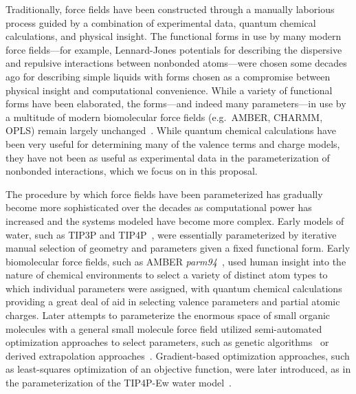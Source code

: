 \documentclass[aps,pre,twocolumn,nofootinbib,superscriptaddress,linenumbers]{revtex4-1}
\begin{document}
Traditionally, force fields have been constructed through a manually laborious process guided by a combination of experimental data, quantum chemical calculations, and physical insight.
The functional forms in use by many modern force fields---for example, Lennard-Jones potentials for describing the dispersive and repulsive interactions between nonbonded atoms---were chosen some decades ago for describing simple liquids with forms chosen as a compromise between physical insight and computational convenience.
While a variety of functional forms have been elaborated, the forms---and indeed many parameters---in use by a multitude of modern biomolecular force fields (e.g.~AMBER, CHARMM, OPLS) remain largely unchanged~\citep{ponder-case:adv-prot-chem:2003:force-fields-review}.
While quantum chemical calculations have been very useful for determining many of the valence terms and charge models, they have not been as useful as experimental data in the parameterization of nonbonded interactions, which we focus on in this proposal.

The procedure by which force fields have been parameterized has gradually become more sophisticated over the decades as computational power has increased and the systems modeled have become more complex.
Early models of water, such as TIP3P and TIP4P~\cite{jorgensen_comparison_1983}, were essentially parameterized by iterative manual selection of geometry and parameters given a fixed functional form.
Early biomolecular force fields, such as AMBER {\em parm94}~\cite{cornell-kollman:jacs:1995:amber94}, used human insight into the nature of chemical environments to select a variety of distinct atom types to which individual parameters were assigned, with quantum chemical calculations providing a great deal of aid in selecting valence parameters and partial atomic charges.
Later attempts to parameterize the enormous space of small organic molecules with a general small molecule force field utilized semi-automated optimization approaches to select parameters, such as genetic algorithms~\cite{wang-kollman:j-comput-chem:2001:genetic-algorithm-parameterization} or derived extrapolation approaches~\cite{Burger2013,Law1997,MacKerrell2002,longo2005,Netz2009}.
Gradient-based optimization approaches, such as least-squares optimization of an objective function, were later introduced, as in the parameterization of the TIP4P-Ew water model~\cite{tip4p-ew}.
\end{document}
